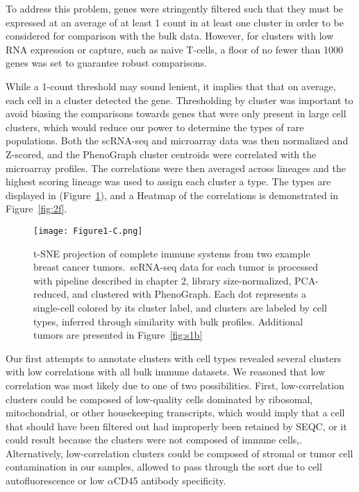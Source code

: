 To address this problem, genes were stringently filtered such that they must be expressed at an average of at least 1 count in at least one cluster in order to be considered for comparison with the bulk data. %
However, for clusters with low RNA expression or capture, such as naive T-cells, a floor of no fewer than 1000 genes was set to guarantee robust comparisons. 

While a 1-count threshold may sound lenient, it implies that that on average, each cell in a cluster detected the gene. 
Thresholding by cluster was important to avoid biasing the comparisons towards genes that were only present in large cell clusters, which would reduce our power to determine the types of rare populations. 
Both the scRNA-seq and microarray data was then normalized and Z-scored, and the PhenoGraph cluster centroids were correlated with the microarray profiles. 
The correlations were then averaged across lineages and the highest scoring lineage was used to assign each cluster a type. The types are displayed in (Figure~\ref{fig:1c}), and a Heatmap of the correlations is demonstrated in Figure~\ref{fig:2f}.

\begin{figure}
\centering
\texttt{[image: Figure1-C.png]}
  \caption{t-SNE projection of complete immune systems from two example breast cancer tumors.\ scRNA-seq data for each tumor is processed with pipeline described in chapter 2, library size-normalized, PCA-reduced, and clustered with PhenoGraph. Each dot represents a single-cell colored by its cluster label, and clusters are labeled by cell types, inferred through similarity with bulk profiles. Additional tumors are presented in Figure~\ref{fig:s1b}} 
\label{fig:1c}
\end{figure} 

Our first attempts to annotate clusters with cell types revealed several clusters with low correlations with all bulk immune datasets. 
We reasoned that low correlation was most likely due to one of two possibilities. 
First, low-correlation clusters could be composed of low-quality cells dominated by ribosomal, mitochondrial, or other housekeeping transcripts, which would imply that a cell that should have been filtered out had improperly been retained by SEQC, or it could result because the clusters were not composed of immune cells,.
Alternatively, low-correlation clusters could be composed of stromal or tumor cell contamination in our samples, allowed to pass through the sort due to cell autofluorescence or low $\alpha$CD45 antibody specificity. 

